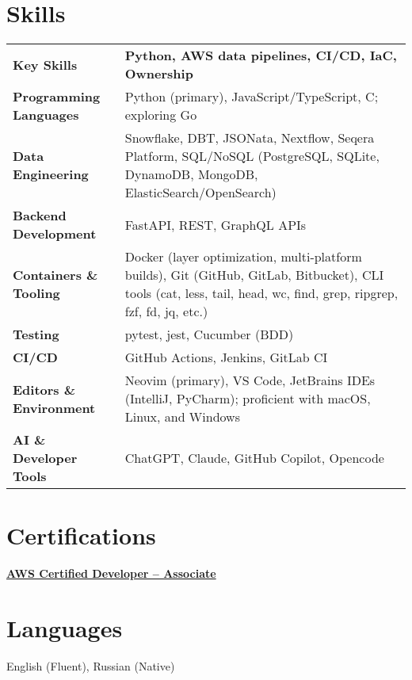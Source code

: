 \documentclass[a4paper,12pt]{article}
\begin{document}
\section{Skills}
\begin{tabularx}{\linewidth}{@{}l X@{}}
\textbf{Key Skills} & \textbf{Python, AWS data pipelines, CI/CD, IaC, Ownership} \\

\textbf{Programming Languages} & Python (primary), JavaScript/TypeScript, C; exploring Go \\

\textbf{Data Engineering} & Snowflake, DBT, JSONata, Nextflow, Seqera Platform, SQL/NoSQL (PostgreSQL, SQLite, DynamoDB, MongoDB, ElasticSearch/OpenSearch) \\

\textbf{Backend Development} & FastAPI, REST, GraphQL APIs \\

\textbf{Containers \& Tooling} & Docker (layer optimization, multi-platform builds), Git (GitHub, GitLab, Bitbucket), CLI tools (cat, less, tail, head, wc, find, grep, ripgrep, fzf, fd, jq, etc.) \\

\textbf{Testing} & pytest, jest, Cucumber (BDD) \\

\textbf{CI/CD} & GitHub Actions, Jenkins, GitLab CI \\

\textbf{Editors \& Environment} & Neovim (primary), VS Code, JetBrains IDEs (IntelliJ, PyCharm); proficient with macOS, Linux, and Windows \\

\textbf{AI \& Developer Tools} & ChatGPT, Claude, GitHub Copilot, Opencode \\
\end{tabularx}

\section{Certifications}
\href{https://www.credly.com/badges/d8a052d1-eca4-4bbb-ad85-b73be14ee3b2/public_url}{\textbf{AWS Certified Developer – Associate}}

\section{Languages}
English (Fluent), Russian (Native)

\vfill
{}
\end{document}
